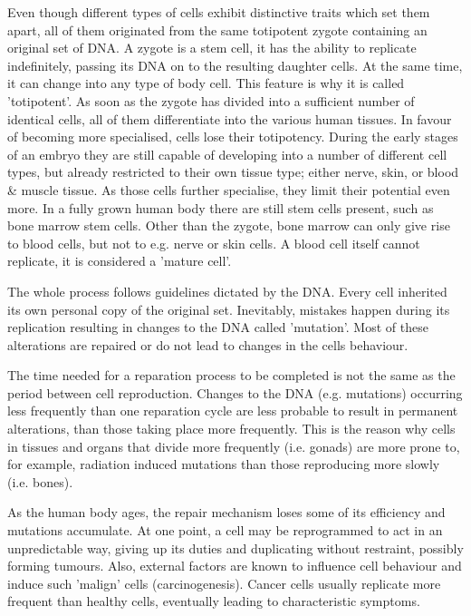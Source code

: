 Even though different types of cells exhibit distinctive traits which set them apart, all of them originated from the same totipotent zygote containing an original set of DNA.
A zygote is a stem cell, it has the ability to replicate indefinitely, passing its DNA on to the resulting daughter cells.
At the same time, it can change into any type of body cell. This feature is why it is called 'totipotent'.
As soon as the zygote has divided into a sufficient number of identical cells, all of them differentiate into the various human tissues.
In favour of becoming more specialised, cells lose their totipotency.
During the early stages of an embryo they are still capable of developing into a number of different cell types, but already restricted to their own tissue type; either nerve, skin, or blood \& muscle tissue.
As those cells further specialise, they limit their potential even more.
In a fully grown human body there are still stem cells present, such as bone marrow stem cells.
Other than the zygote, bone marrow can only give rise to blood cells, but not to e.g. nerve or skin cells.
A blood cell itself cannot replicate, it is considered a 'mature cell'.

The whole process follows guidelines dictated by the DNA.
Every cell inherited its own personal copy of the original set.
Inevitably, mistakes happen during its replication resulting in changes to the DNA called 'mutation'.
Most of these alterations are repaired or do not lead to changes in the cells behaviour.

The time needed for a reparation process to be completed is not the same as the period between cell reproduction. Changes to the DNA (e.g. mutations) occurring less frequently than one reparation cycle are less probable to result in permanent alterations, than those taking place more frequently. This is the reason why cells in tissues and organs that divide more frequently (i.e. gonads) are more prone to, for example, radiation induced mutations than those reproducing more slowly (i.e. bones).

As the human body ages, the repair mechanism loses some of its efficiency and mutations accumulate.
At one point, a cell may be reprogrammed to act in an unpredictable way, giving up its duties and duplicating without restraint, possibly forming tumours.
Also, external factors are known to influence cell behaviour and induce such 'malign' cells (carcinogenesis).
Cancer cells usually replicate more frequent than healthy cells, eventually leading to characteristic symptoms.

